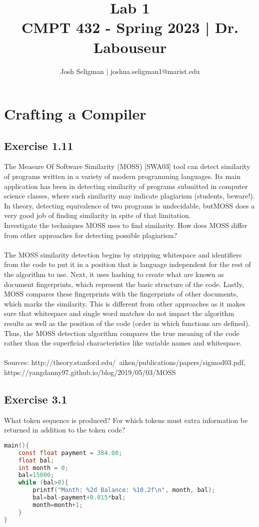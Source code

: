 \documentclass[letterpaper, 10pt, DIV=13]{scrartcl}
\title {
	\normalfont
	\huge{Lab 1} \\
	\vspace{10pt}
	\large{CMPT 432 - Spring 2023 | Dr. Labouseur}
}
\author{\normalfont Josh Seligman | joshua.seligman1@marist.edu}
\numberwithin{equation}{section}
\numberwithin{figure}{section}
\numberwithin{table}{section}
\begin{document}
\maketitle

\section{Crafting a Compiler}
\subsection{Exercise 1.11}
The Measure Of Software Similarity (MOSS) [SWA03] tool can detect similarity of programs written in a variety of modern programming languages. Its main application has been in detecting similarity of programs submitted in computer science classes, where such similarity may indicate plagiarism (students, beware!). In theory, detecting equivalence of two programs is undecidable, butMOSS does a very good job of finding similarity in spite of that limitation. \\ Investigate the techniques MOSS uses to find similarity. How does MOSS differ from other approaches for detecting possible plagiarism?
\\\\
The MOSS similarity detection begins by stripping whitespace and identifiers from the code to put it in a position that is language independent for the rest of the algorithm to use. Next, it uses hashing to create what are known as document fingerprints, which represent the basic structure of the code. Lastly, MOSS compares these fingerprints with the fingerprints of other documents, which marks the similarity. This is different from other approaches as it makes sure that whitespace and single word matches do not impact the algorithm results as well as the position of the code (order in which functions are defined). Thus, the MOSS detection algorithm compares the true meaning of the code rather than the superficial characteristics like variable names and whitespace.
\\\\
Sources: http://theory.stanford.edu/~aiken/publications/papers/sigmod03.pdf,\\https://yangdanny97.github.io/blog/2019/05/03/MOSS

\subsection{Exercise 3.1}
What token sequence is produced? For which tokens must extra information be returned in addition to the token code?
\begin{lstlisting}[frame=single, language=C]
main(){
    const float payment = 384.00;
    float bal;
    int month = 0;
    bal=15000;
    while (bal>0){
        printf("Month: %2d Balance: %10.2f\n", month, bal);
        bal=bal-payment+0.015*bal;
        month=month+1;
    }
}
\end{lstlisting}
\end{document}
